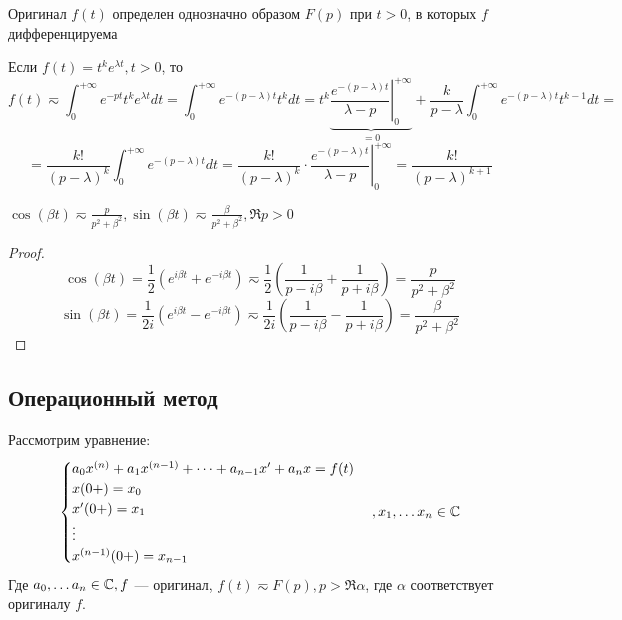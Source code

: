 \begin{proposition}[б/д]
    Оригинал \(f(t)\) определен однозначно образом \(F(p)\) при \(t > 0\), в которых \(f\) дифференцируема
\end{proposition}

\begin{note}
    Если \(f(t) = t^ke^{\lambda t}, t > 0\), то
    \[f(t) \eqsim \int_0^{+\infty} e^{-pt}t^ke^{\lambda t}dt = \int_0^{+\infty} e^{-(p - \lambda)t}t^k dt = t^k\underbrace{\left.\frac{e^{-(p - \lambda)t}}{\lambda - p}\right|_0^{+\infty}}_{= 0} + \frac{k}{p - \lambda} \int_0^{+\infty} e^{-(p - \lambda)t}t^{k - 1}dt = \]
    \[= \frac{k!}{(p - \lambda)^k}\int_0^{+\infty}e^{-(p - \lambda)t}dt = \frac{k!}{(p - \lambda)^k} \cdot \left.\frac{e^{-(p - \lambda)t}}{\lambda - p}\right|_0^{+\infty} = \frac{k!}{(p - \lambda)^{k + 1}}\]
\end{note}

\begin{proposition}
    \(\cos(\beta t) \eqsim \frac{p}{p^2 + \beta^2}, \sin(\beta t) \eqsim \frac{\beta}{p^2 + \beta^2}, \Re p > 0\)
\end{proposition}
\begin{proof}
    \[\cos(\beta t) = \frac{1}{2}\left( e^{i\beta t} + e^{-i\beta t} \right) \eqsim \frac{1}{2}\left( \frac{1}{p - i\beta} + \frac{1}{p + i\beta} \right) = \frac{p}{p^2 + \beta^2}\]
    \[\sin(\beta t) = \frac{1}{2i}\left( e^{i\beta t} - e^{-i\beta t} \right) \eqsim \frac{1}{2i}\left( \frac{1}{p - i\beta} - \frac{1}{p + i\beta} \right) = \frac{\beta}{p^2 + \beta^2}\]
\end{proof}

\subsection{Операционный метод}
Рассмотрим уравнение:
\begin{equation}
    \begin{cases}
        a_0x^{(n)} + a_1x^{(n - 1)} + \dots + a_{n - 1}x' + a_nx = f(t) \\
        x(0 +) = x_0 \\
        x'(0 +) = x_1 \\
        \vdots \\
        x^{(n - 1)}(0 +) = x_{n - 1} \\
    \end{cases}, x_1, \dots x_n \in \mathbb{C}
\end{equation}
Где \(a_0, \dots a_n \in \mathbb{C}, f\) --- оригинал, \(f(t) \eqsim F(p), p > \Re \alpha\), где \(\alpha\) соответствует оригиналу \(f\).


